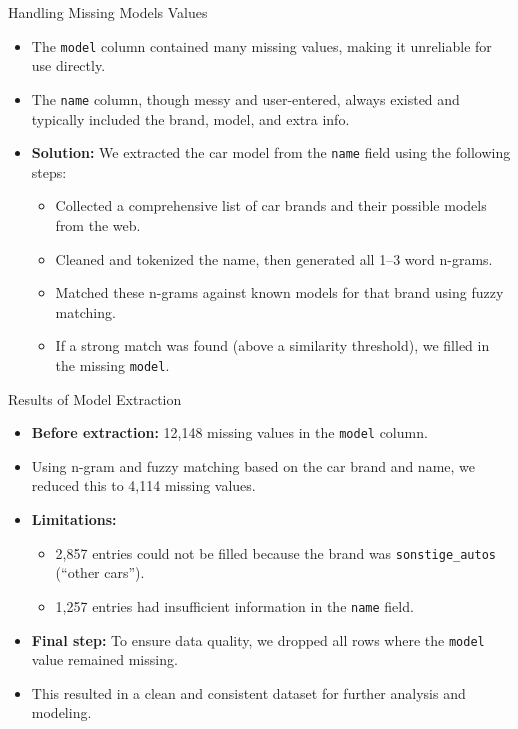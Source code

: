 \documentclass{beamer}
\begin{document}
\begin{frame}{Handling Missing Models Values}
    \begin{itemize}
        \item The \texttt{model} column contained many missing values, making it unreliable for use directly.
        \item The \texttt{name} column, though messy and user-entered, always existed and typically included the brand, model, and extra info.
        \item \textbf{Solution:} We extracted the car model from the \texttt{name} field using the following steps:
        \begin{itemize}
            \item Collected a comprehensive list of car brands and their possible models from the web.
            \item Cleaned and tokenized the name, then generated all 1–3 word n-grams.
           \item Matched these n-grams against known models for that brand using fuzzy matching.
            \item If a strong match was found (above a similarity threshold), we filled in the missing \texttt{model}.
        \end{itemize}
    \end{itemize}
\end{frame}

\begin{frame}{Results of Model Extraction}
    \begin{itemize}
        \item \textbf{Before extraction:} 12,148 missing values in the \texttt{model} column.
        \item Using n-gram and fuzzy matching based on the car brand and name, we reduced this to 4,114 missing values.
        \item \textbf{Limitations:}
        \begin{itemize}
            \item 2,857 entries could not be filled because the brand was \texttt{sonstige\_autos} (“other cars”).
            \item 1,257 entries had insufficient information in the \texttt{name} field.
        \end{itemize}
        \item \textbf{Final step:} To ensure data quality, we dropped all rows where the \texttt{model} value remained missing.
        \item This resulted in a clean and consistent dataset for further analysis and modeling.
    \end{itemize}
\end{frame}
\end{document}
